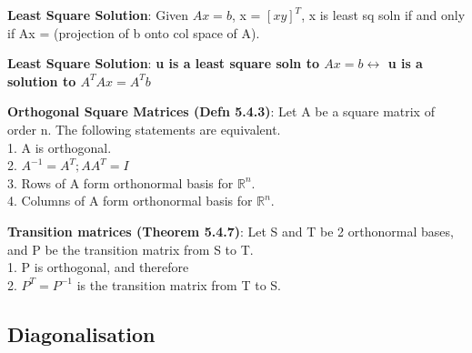 \documentclass[a4paper,landscape]{article}
\newcommand{\rntopic}[1]{\vspace{-2.0em}\subsection*{#1}\vspace{-1.0em}}
\newcommand{\rnname}[1]{\textbf{#1}}
\begin{document}
\begin{multicols*}{4}
\begin{flatitemize}
\item \rnname{Least Square Solution}: Given $Ax = b$, x = $[x y]^{T}$, x is least sq soln if and only if Ax = (projection of b onto col space of A).
\item \rnname{Least Square Solution}: \textbf{u is a least square soln to $Ax=b \leftrightarrow$ u is a solution to $A^TAx = A^Tb$}
\item \rnname{Orthogonal Square Matrices (Defn 5.4.3)}: Let A be a square matrix of order n. The following statements are equivalent.\\
1. A is orthogonal.\\
2. $A^{-1} = A^T; AA^T = I$ \\
3. Rows of A form orthonormal basis for $\mathbb{R}^n$.\\
4. Columns of A form orthonormal basis for $\mathbb{R}^n$.\\
\item \rnname{Transition matrices (Theorem 5.4.7)}: Let S and T be 2 orthonormal bases, and P be the transition matrix from S to T.\\
1. P is orthogonal, and therefore \\
2. $P^T = P^{-1}$ is the transition matrix from T to S.
\end{flatitemize}

\rntopic{Diagonalisation}


\end{multicols*}
\end{document}
